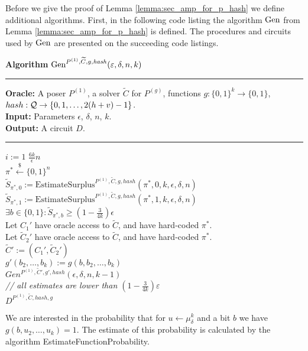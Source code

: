 %
%
Before we give the proof of Lemma \ref{lemma:sec_amp_for_p_hash} we define additional algorithms.
First, in the following code listing the algorithm $\operatorname{\text{Gen}}$ from Lemma \ref{lemma:sec_amp_for_p_hash} is defined.
The procedures and circuits used by $\operatorname{\text{Gen}}$ are presented on the succeeding code listings.
\begin{codeblock}
  \textbf{Algorithm} $\operatorname{\text{Gen}}^{P^{(1)}, \widetilde{C}, g, \mathit{hash}}(\varepsilon, \delta, n, k)$
  \medskip \hrule
  \textbf{Oracle:} A poser $P^{(1)}$, a solver $\widetilde{C}$ for $P^{(g)}$, functions $g: \{0,1\}^{k} \rightarrow \{0,1\}$, $hash:\mathcal{Q} \rightarrow \{0,1, \dots, 2(h + v) - 1\}$. \\
  \textbf{Input:}  Parameters $\epsilon$, $\delta$, $n$, $k$.\\
  \textbf{Output:} A circuit $D$.
  \medskip\hrule
  \For $i:=1$ \To $\frac{6k}{\epsilon}n$ \Do \\
  \IndI $\pi^* \xleftarrow{\$} \{0,1\}^{n}$\\
  \IndI $\widetilde{S}_{\pi^*,0} := \text{EstimateSurplus}^{P^{(1)},  \widetilde{C}, g, hash}(\pi^*, 0, k, \epsilon, \delta,n)$\\
  \IndI $\widetilde{S}_{\pi^*,1} := \text{EstimateSurplus}^{P^{(1)},  \widetilde{C}, g, hash}(\pi^*, 1, k, \epsilon, \delta,n)$\\
  \IndI \If $ \exists b \in \{0,1\}: \widetilde{S}_{\pi^*,b} \geq (1 - \frac{3}{4k}) \epsilon$ \Then \\
  \IndII Let $C_1'$ have oracle access to $\widetilde{C}$, and have hard-coded $\pi^*$. \\
  \IndII Let $\widetilde{C}_2'$ have oracle access to $\widetilde{C}$, and have hard-coded $\pi^*$. \\
  \IndII $\widetilde{C}' := (C_1', \widetilde{C}_2')$ \\
  \IndII $g'(b_2, \dots, b_k) := g(b, b_2, \dots, b_k)$\\
  \IndII\Return $Gen^{P^{(1)}, \widetilde{C}', g', hash}(\epsilon, \delta, n, k-1)$ \\
  \textit{// all estimates are lower than $(1-\frac{3}{4k})\varepsilon$}\\
  \Return $D^{P^{(1)}, \widetilde{C}, hash, g}$
\end{codeblock}
We are interested in the probability that for $u \leftarrow \mu_{\delta}^k$ and a bit $b$ we have $g(b,u_2, \dotsc, u_k) = 1$.
The estimate of this probability is calculated by the algorithm EstimateFunctionProbability.
%
